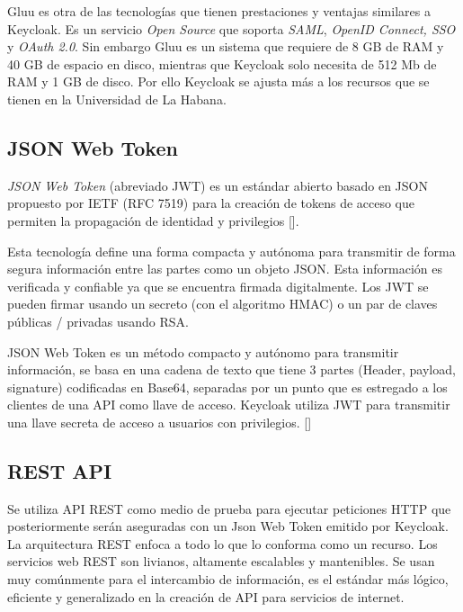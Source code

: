 Gluu es otra de las tecnologías que tienen prestaciones y ventajas similares a Keycloak. Es un servicio \textit{Open Source} que soporta \textit{SAML}, \textit{OpenID Connect, SSO} y \textit{OAuth 2.0}. Sin embargo Gluu es un sistema que requiere de 8 GB de RAM y 40 GB de espacio en disco, mientras que Keycloak solo necesita de 512 Mb de RAM y 1 GB de disco. Por ello Keycloak se ajusta más a los recursos que se tienen en la Universidad de La Habana.

\subsection{JSON Web Token}
\textit{JSON Web Token }(abreviado JWT) es un estándar abierto basado en JSON propuesto por IETF (RFC 7519) para la creación de tokens de acceso que permiten la propagación de identidad y privilegios [\cite{bradley_sakimura_jones_2015}].

Esta tecnología define una forma compacta y autónoma para transmitir de forma segura información entre las partes como un objeto JSON. Esta información es verificada y confiable ya que se encuentra firmada digitalmente. Los JWT se pueden firmar usando un secreto (con el algoritmo HMAC) o un par de claves públicas / privadas usando RSA.

JSON Web Token es un método compacto y autónomo para transmitir información, se basa en una cadena de texto que tiene 3 partes (Header, payload, signature) codificadas en Base64, separadas por un punto que es estregado a los clientes de una API como llave de acceso. Keycloak utiliza JWT para transmitir una llave secreta de acceso a usuarios con privilegios. [\cite{muyon2020metodos}]


\subsection{REST API}
Se utiliza API REST como medio de prueba para ejecutar peticiones HTTP que posteriormente serán aseguradas con un Json Web Token emitido por Keycloak. La arquitectura REST enfoca a todo lo que lo conforma como un recurso. Los servicios web REST son livianos, altamente escalables y mantenibles. Se usan muy comúnmente para el intercambio de información, es el estándar más lógico, eficiente y generalizado en la creación de API para servicios de internet.

